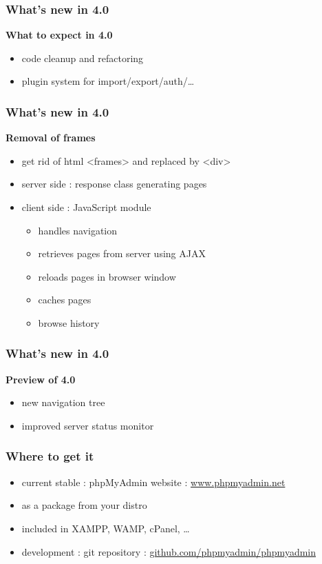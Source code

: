 \documentclass[14pt]{beamer}
\begin{document}
  \begin{frame}
    \frametitle{What's new in 4.0}
    \textbf{{\color{PmaOlive}What to expect in 4.0}}
    \pause
    \begin{itemize}[<+->]
      \item code cleanup and refactoring
      \item plugin system for import/export/auth/\ldots
    \end{itemize}
  \end{frame}
  \begin{frame}
    \frametitle{What's new in 4.0}
    \textbf{{\color{PmaOlive}Removal of frames}}
    \pause
    \begin{itemize}[<+->]
      \item get rid of html <frames> and replaced by <div>
      \item server side : response class generating pages
      \item client side : JavaScript module 
      \begin{itemize}[<+->]
	\item handles navigation
        \item retrieves pages from server using AJAX
        \item reloads pages in browser window
	\item caches pages
	\item browse history
      \end{itemize}
    \end{itemize}
  \end{frame}
  \begin{frame}
    \frametitle{What's new in 4.0}
    \textbf{{\color{PmaOlive}Preview of 4.0}}
     \begin{itemize}
      \item new navigation tree
      \item improved server status monitor
    \end{itemize}
  \end{frame}
  \begin{frame}
    \frametitle{Where to get it}
    \begin{itemize}[<+->]
      \item current stable : phpMyAdmin website : \href{http://www.phpmyadmin.net/}{www.phpmyadmin.net}
      \item as a package from your distro
      \item included in XAMPP, WAMP, cPanel, \ldots
      \item development : git repository :  \href{https://github.com/phpmyadmin/phpmyadmin}{github.com/phpmyadmin/phpmyadmin}
    \end{itemize}
  \end{frame}
\end{document}
